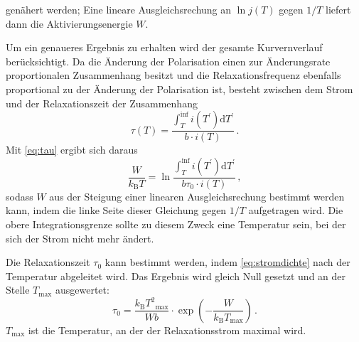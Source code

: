 genähert werden; Eine lineare Ausgleichsrechung an $\ln{j(T)}$ gegen $1/T$ liefert dann die Aktivierungsenergie $W$.\par
Um ein genaueres Ergebnis zu erhalten wird der gesamte Kurvernverlauf berücksichtigt. Da die Änderung der Polarisation einen zur Änderungsrate proportionalen Zusammenhang besitzt und die Relaxationsfrequenz ebenfalls proportional zu der Änderung der Polarisation ist, besteht zwischen dem Strom und der Relaxationszeit der Zusammenhang
\begin{equation}
  \tau(T) = \frac{\int_{T}^{\inf} i(T^\prime) \text{d}T^\prime}{b \cdot i(T)}\,.
\end{equation}
Mit \autoref{eq:tau} ergibt sich daraus
\begin{equation}
  \frac{W}{k_\text{B}T} = \ln{\frac{\int_{T}^{\inf} i(T^\prime) \text{d}T^\prime}{b \tau_0 \cdot i(T)}}\,,
  \label{eq:meth2}
\end{equation}
sodass $W$ aus der Steigung einer linearen Ausgleichsrechung bestimmt werden kann, indem die linke Seite dieser Gleichung gegen $1/T$ aufgetragen wird. Die obere Integrationsgrenze sollte zu diesem Zweck eine Temperatur sein, bei der sich der Strom nicht mehr ändert.\par
Die Relaxationszeit $\tau_0$ kann bestimmt werden, indem \autoref{eq:stromdichte} nach der Temperatur abgeleitet wird. Das Ergebnis wird gleich Null gesetzt und an der Stelle $T_\text{max}$ ausgewertet:
\begin{equation}
  \tau_0 = \frac{k_\text{B} {T^2}_\text{max}}{W b} \cdot \exp{\left(- \frac{W}{k_\text{B} T_\text{max}}\right)}\,.
  \label{eq:tau0}
\end{equation}
$T_\text{max}$ ist die Temperatur, an der der Relaxationsstrom maximal wird.
